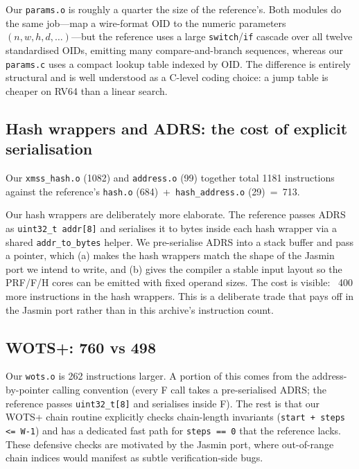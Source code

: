 \documentclass[11pt,a4paper]{article}
\begin{document}
Our \texttt{params.o} is roughly a quarter the size of the reference's.
Both modules do the same job---map a wire-format OID to the numeric
parameters $(n, w, h, d, \ldots)$---but the reference uses a large
\texttt{switch}/\texttt{if} cascade over all twelve standardised OIDs,
emitting many compare-and-branch sequences, whereas our
\texttt{params.c} uses a compact lookup table indexed by OID.  The
difference is entirely structural and is well understood as a C-level
coding choice: a jump table is cheaper on RV64 than a linear search.

\subsection{Hash wrappers and ADRS: the cost of explicit serialisation}

Our \texttt{xmss\_hash.o} (1082) and \texttt{address.o} (99) together
total 1181 instructions against the reference's \texttt{hash.o}
(684)~+~\texttt{hash\_address.o} (29)~=~713.

Our hash wrappers are deliberately more elaborate.  The reference
passes ADRS as \texttt{uint32\_t addr[8]} and serialises it to bytes
inside each hash wrapper via a shared \texttt{addr\_to\_bytes} helper.
We pre-serialise ADRS into a stack buffer and pass a pointer, which
(a) makes the hash wrappers match the shape of the Jasmin port we
intend to write, and (b) gives the compiler a stable input layout so
the PRF/F/H cores can be emitted with fixed operand sizes.  The cost
is visible: ~400 more instructions in the hash wrappers.  This is a
deliberate trade that pays off in the Jasmin port rather than in this
archive's instruction count.

\subsection{WOTS+: 760 vs 498}

Our \texttt{wots.o} is 262 instructions larger.  A portion of this
comes from the address-by-pointer calling convention (every F call
takes a pre-serialised ADRS; the reference passes \texttt{uint32\_t[8]}
and serialises inside F).  The rest is that our WOTS+ chain routine
explicitly checks chain-length invariants (\texttt{start + steps <= W-1})
and has a dedicated fast path for \texttt{steps == 0} that the
reference lacks.  These defensive checks are motivated by the Jasmin
port, where out-of-range chain indices would manifest as subtle
verification-side bugs.
\end{document}

